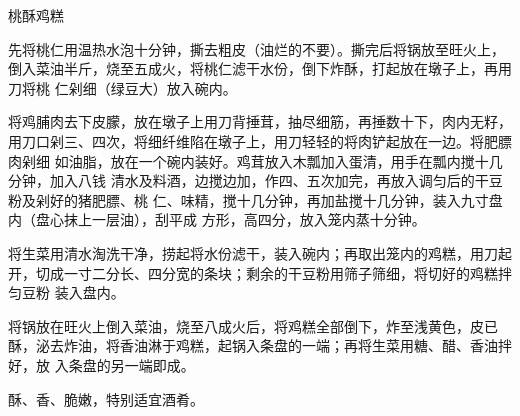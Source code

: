 \begin{recipe}{桃酥鸡糕}

\ingredients


\preparation

\step 先将桃仁用温热水泡十分钟，撕去粗皮（油烂的不要）。撕完后将锅放至旺火上，
倒入菜油半斤，烧至五成火，将桃仁滤干水份，倒下炸酥，打起放在墩子上，再用刀将桃
仁剁细（绿豆大）放入碗内。

\step 将鸡脯肉去下皮朦，放在墩子上用刀背捶茸，抽尽细筋，再捶数十下，肉内无籽，
用刀口剁三、四次，将细纤维陷在墩子上，用刀轻轻的将肉铲起放在一边。将肥膘肉剁细
如油脂，放在一个碗内装好。鸡茸放入木瓢加入蛋清，用手在瓢内搅十几分钟，加入八钱
清水及料酒，边搅边加，作四、五次加完，再放入调匀后的干豆粉及剁好的猪肥膘、桃
仁、味精，搅十几分钟，再加盐搅十几分钟，装入九寸盘内（盘心抹上一层油），刮平成
方形，高四分，放入笼内蒸十分钟。

\step 将生菜用清水淘洗干净，捞起将水份滤干，装入碗内；再取出笼内的鸡糕，用刀起
开，切成一寸二分长、四分宽的条块；剩余的干豆粉用筛子筛细，将切好的鸡糕拌匀豆粉
装入盘内。

\step 将锅放在旺火上倒入菜油，烧至八成火后，将鸡糕全部倒下，炸至浅黄色，皮已
酥，泌去炸油，将香油淋于鸡糕，起锅入条盘的一端；再将生菜用糖、醋、香油拌好，放
入条盘的另一端即成。

\features

酥、香、脆嫩，特别适宜酒肴。

\end{recipe}

